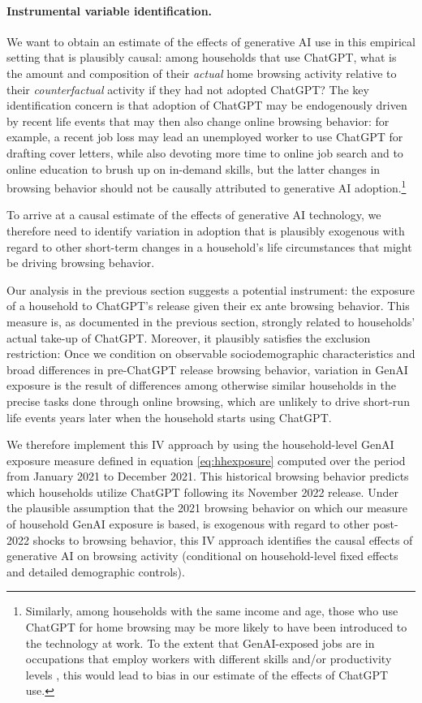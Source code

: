 \documentclass[12pt]{article}
\begin{document}
\paragraph{Instrumental variable identification.} We want to obtain an estimate of the effects of generative AI use in this empirical setting that is plausibly causal: among households that use ChatGPT, what is the amount and composition of their \textit{actual} home browsing activity 
relative to their \textit{counterfactual} activity if they had not adopted ChatGPT?  The key identification concern is that adoption of ChatGPT may be endogenously driven by recent life events that may then also change online browsing behavior: for example, a recent job loss may lead an unemployed worker to use ChatGPT for drafting cover letters, while also devoting more time to online job search and to online education to brush up on in-demand skills, but the latter changes in browsing behavior should not be causally attributed to generative AI adoption.\footnote{Similarly, among households with the same income and age, those who use ChatGPT for home browsing may be more likely to have been introduced to the technology at work. To the extent that GenAI-exposed jobs are in occupations that employ workers with different skills and/or productivity levels \citep{eisfeldt2013}, this would lead to bias in our estimate of the effects of ChatGPT use.} 

To arrive at a causal estimate  of the effects of generative AI technology, we therefore need to identify variation in adoption that is plausibly exogenous with regard to other short-term changes in a household's life circumstances that might be driving browsing behavior.


Our analysis in the previous section suggests a potential instrument: the exposure of a household to ChatGPT's release given their ex ante browsing behavior. This measure is, as documented in the previous section, strongly related to households' actual take-up of ChatGPT. Moreover, it plausibly satisfies the exclusion restriction: Once we condition on observable sociodemographic characteristics and broad differences in pre-ChatGPT release browsing behavior, variation in GenAI exposure is the result of differences among otherwise similar households in the precise tasks done through online browsing, which are unlikely to drive short-run life events years later when the household starts using ChatGPT.

We therefore implement this IV approach by using the household-level GenAI exposure measure defined in equation \eqref{eq:hhexposure} computed over the period from January 2021 to December 2021. This historical browsing behavior predicts which households utilize ChatGPT following its November 2022 release. Under the plausible assumption that the 2021 browsing behavior on which our measure of household GenAI exposure is based, is exogenous with regard to other post-2022 shocks to browsing behavior, this IV approach identifies the causal effects of generative AI on browsing activity (conditional on household-level fixed effects and detailed demographic controls).
\end{document}
